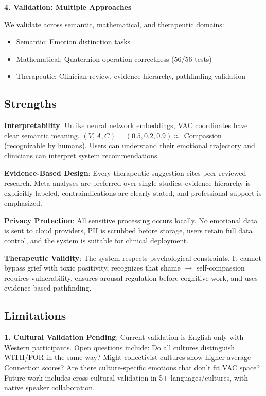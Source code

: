 \textbf{4. Validation: Multiple Approaches}

We validate across semantic, mathematical, and therapeutic domains:
\begin{itemize}
    \item Semantic: Emotion distinction tasks
    \item Mathematical: Quaternion operation correctness (56/56 tests)
    \item Therapeutic: Clinician review, evidence hierarchy, pathfinding validation
\end{itemize}

\subsection{Strengths}

\textbf{Interpretability}: Unlike neural network embeddings, VAC coordinates have clear semantic meaning. $(V, A, C) = (0.5, 0.2, 0.9) \approx$ Compassion (recognizable by humans). Users can understand their emotional trajectory and clinicians can interpret system recommendations.

\textbf{Evidence-Based Design}: Every therapeutic suggestion cites peer-reviewed research. Meta-analyses are preferred over single studies, evidence hierarchy is explicitly labeled, contraindications are clearly stated, and professional support is emphasized.

\textbf{Privacy Protection}: All sensitive processing occurs locally. No emotional data is sent to cloud providers, PII is scrubbed before storage, users retain full data control, and the system is suitable for clinical deployment.

\textbf{Therapeutic Validity}: The system respects psychological constraints. It cannot bypass grief with toxic positivity, recognizes that shame $\rightarrow$ self-compassion requires vulnerability, ensures arousal regulation before cognitive work, and uses evidence-based pathfinding.

\subsection{Limitations}

\textbf{1. Cultural Validation Pending}: Current validation is English-only with Western participants. Open questions include: Do all cultures distinguish WITH/FOR in the same way? Might collectivist cultures show higher average Connection scores? Are there culture-specific emotions that don't fit VAC space? Future work includes cross-cultural validation in 5+ languages/cultures, with native speaker collaboration.

